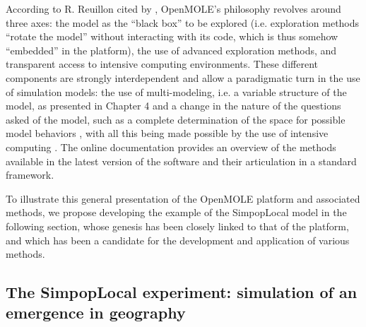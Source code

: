 \documentclass[10pt]{article}
\begin{document}
According to R. Reuillon cited by \cite{raimbault2017applied}, OpenMOLE’s philosophy revolves around three axes: the model as the ``black box'' to be explored (i.e. exploration methods ``rotate the model'' without interacting with its code, which is thus somehow ``embedded'' in the platform), the use of advanced exploration methods, and transparent access to intensive computing environments. These different components are strongly interdependent and allow a paradigmatic turn in the use of simulation models: the use of multi-modeling, i.e. a variable structure of the model, as presented in Chapter 4 \citep{cottineau2015modular} and a change in the nature of the questions asked of the model, such as a complete determination of the space for possible model behaviors \citep{10.1371/journal.pone.0138212}, with all this being made possible by the use of intensive computing \citep{schmitt2015half}. The online documentation provides an overview of the methods available in the latest version of the software and their articulation in a standard framework.


To illustrate this general presentation of the OpenMOLE platform and associated methods, we propose developing the example of the SimpopLocal model in the following section, whose genesis has been closely linked to that of the platform, and which has been a candidate for the development and application of various methods.


\subsection{The SimpopLocal experiment: simulation of an emergence in geography}
\end{document}
